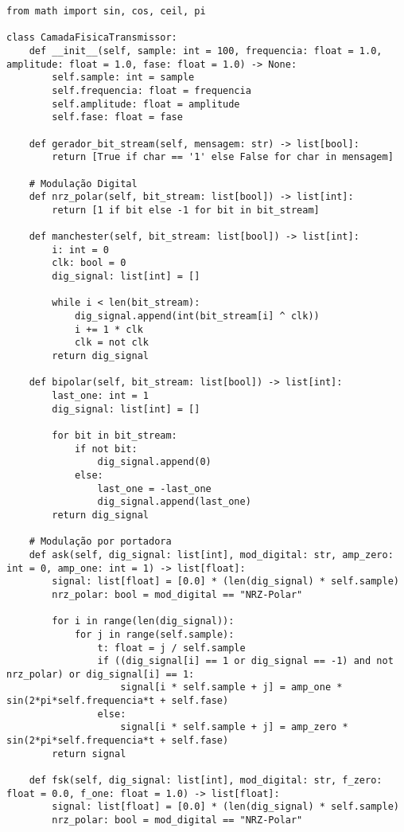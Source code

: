 \documentclass[12pt, a4paper]{article}
\newenvironment{code}{\captionsetup{type=listing}}{}
\begin{document}
\begin{code}
\begin{verbatim}
from math import sin, cos, ceil, pi

class CamadaFisicaTransmissor:
    def __init__(self, sample: int = 100, frequencia: float = 1.0, amplitude: float = 1.0, fase: float = 1.0) -> None:
        self.sample: int = sample
        self.frequencia: float = frequencia
        self.amplitude: float = amplitude
        self.fase: float = fase

    def gerador_bit_stream(self, mensagem: str) -> list[bool]:
        return [True if char == '1' else False for char in mensagem]

    # Modulação Digital
    def nrz_polar(self, bit_stream: list[bool]) -> list[int]:
        return [1 if bit else -1 for bit in bit_stream]

    def manchester(self, bit_stream: list[bool]) -> list[int]:
        i: int = 0
        clk: bool = 0
        dig_signal: list[int] = []

        while i < len(bit_stream):
            dig_signal.append(int(bit_stream[i] ^ clk))
            i += 1 * clk
            clk = not clk
        return dig_signal

    def bipolar(self, bit_stream: list[bool]) -> list[int]:
        last_one: int = 1
        dig_signal: list[int] = []

        for bit in bit_stream:
            if not bit:
                dig_signal.append(0)
            else:
                last_one = -last_one
                dig_signal.append(last_one)
        return dig_signal

    # Modulação por portadora
    def ask(self, dig_signal: list[int], mod_digital: str, amp_zero: int = 0, amp_one: int = 1) -> list[float]:
        signal: list[float] = [0.0] * (len(dig_signal) * self.sample)
        nrz_polar: bool = mod_digital == "NRZ-Polar"

        for i in range(len(dig_signal)):
            for j in range(self.sample):
                t: float = j / self.sample
                if ((dig_signal[i] == 1 or dig_signal == -1) and not nrz_polar) or dig_signal[i] == 1:
                    signal[i * self.sample + j] = amp_one * sin(2*pi*self.frequencia*t + self.fase)
                else:
                    signal[i * self.sample + j] = amp_zero * sin(2*pi*self.frequencia*t + self.fase)
        return signal

    def fsk(self, dig_signal: list[int], mod_digital: str, f_zero: float = 0.0, f_one: float = 1.0) -> list[float]:
        signal: list[float] = [0.0] * (len(dig_signal) * self.sample)
        nrz_polar: bool = mod_digital == "NRZ-Polar"


\end{verbatim}
\end{code}
\end{document}
